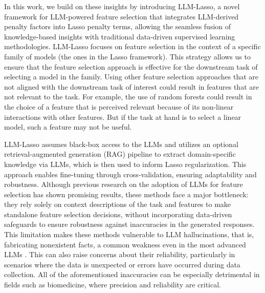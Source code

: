 In this work, we build on these insights by introducing LLM-Lasso, a novel framework for LLM-powered feature selection that integrates LLM-derived penalty factors into Lasso penalty terms, allowing the seamless fusion of knowledge-based insights with traditional data-driven supervised learning methodologies. LLM-Lasso focuses on feature selection in the context of a specific family of models (the ones in the Lasso framework). This strategy allows us to ensure that the feature selection approach is effective for the downstream task of selecting a model in the family. Using other feature selection approaches that are not aligned with the downstream task of interest could result in features that are not relevant to the task. For example, the use of random forests could result in the choice of a feature that is perceived relevant because of its non-linear interactions with other features. But if the task at hand is to select a linear model, such a feature may not be useful.  

LLM-Lasso assumes black-box access to the LLMs and utilizes an optional retrieval-augmented generation (RAG) pipeline \citep{lewis2020retrieval,shuster2022fact,wu2024retrievalaugmentedgenerationnaturallanguage,siriwardhana-etal-2023-improving} to extract domain-specific knowledge via LLMs, which is then used to inform Lasso regularization. This approach enables fine-tuning through cross-validation, ensuring adaptability and robustness. Although previous research on the adoption of LLMs for feature selection has shown promising results, these methods face a major bottleneck: they rely solely on context descriptions of the task and features to make standalone feature selection decisions, without incorporating data-driven safeguards to ensure robustness against inaccuracies in the generated responses. This limitation makes these methods vulnerable to LLM hallucinations, that is, fabricating nonexistent facts, a common weakness even in the most advanced LLMs \citep{Huang_2024, yao2024llmlieshallucinationsbugs}. This can also raise concerns about their reliability, particularly in scenarios where the data is unexpected or errors have occurred during data collection. All of the aforementioned inaccuracies can be especially detrimental in fields such as biomedicine, where precision and reliability are critical. 

